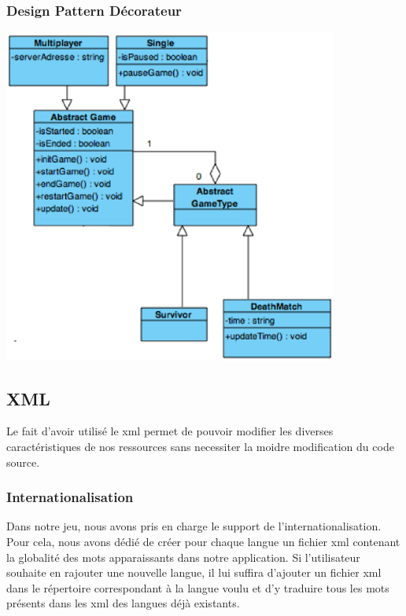 		\subsubsection{Design Pattern Décorateur}
		
			\begin{center}
				\includegraphics[width=11cm]{./Reutilisabilite/Img/decorateur.eps}
			\end{center} 
		
	\subsection{XML}
	
		Le fait d'avoir utilisé le \gls{xml} permet de pouvoir modifier les diverses caractéristiques de nos
		ressources sans necessiter la moidre modification du code source.
	
		\subsubsection{Internationalisation}
		
			Dans notre jeu, nous avons pris en charge le support de l'internationalisation.
			Pour cela, nous avons dédié de créer pour chaque langue un fichier \gls{xml} contenant
			la globalité des mots apparaissants dans notre application.
			Si l'utilisateur souhaite en rajouter une nouvelle langue, il lui suffira d'ajouter
			un fichier \gls{xml} dans le répertoire correspondant à la langue voulu et d'y traduire
			tous les mots présents dans les \gls{xml} des langues déjà existants.
	
